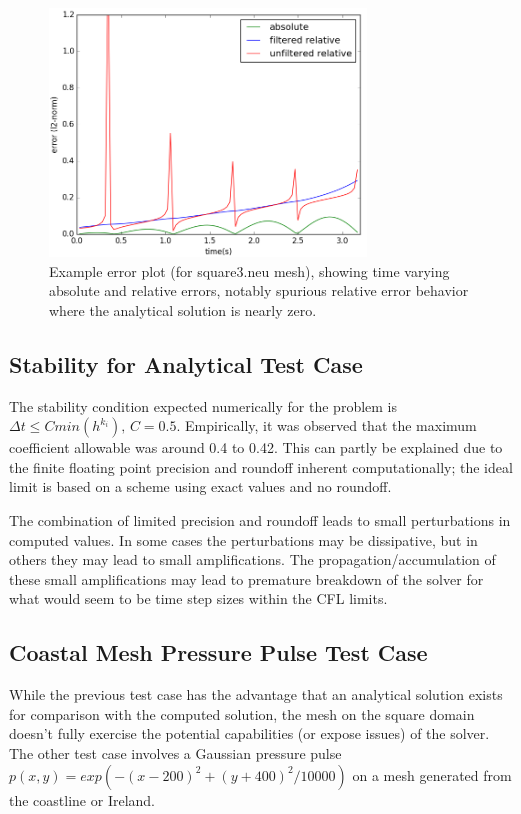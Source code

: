 \documentclass[letterpaper,10pt]{article}
\begin{document}
\begin{figure}[!htb]
\centering
\includegraphics[width=0.75\textwidth]{error3.PNG}
\caption{\label{fig:unrolled}Example error plot (for square3.neu mesh), showing time varying absolute and relative errors, notably spurious relative error behavior where the analytical solution is nearly zero.}
\end{figure}

\newpage

\subsection*{Stability for Analytical Test Case}
The stability condition expected numerically for the problem is $\Delta t \leq C min(h^{k_i}), \, C=0.5$. Empirically, it was observed that the maximum coefficient allowable was around 0.4 to 0.42. This can partly be explained due to the finite floating point precision and roundoff inherent computationally; the ideal limit is based on a scheme using exact values and no roundoff.

The combination of limited precision and roundoff leads to small perturbations in computed values. In some cases the perturbations may be dissipative, but in others they may lead to small amplifications. The propagation/accumulation of these small amplifications may lead to premature breakdown of the solver for what would seem to be time step sizes within the CFL limits.

\subsection*{Coastal Mesh Pressure Pulse Test Case}
While the previous test case has the advantage that an analytical solution exists for comparison with the computed solution, the mesh on the square domain doesn't fully exercise the potential capabilities (or expose issues) of the solver. The other test case involves a Gaussian pressure pulse $p(x,y) = exp(-(x-200)^2+(y+400)^2/10000)$ on a mesh generated from the coastline or Ireland.
\end{document}
